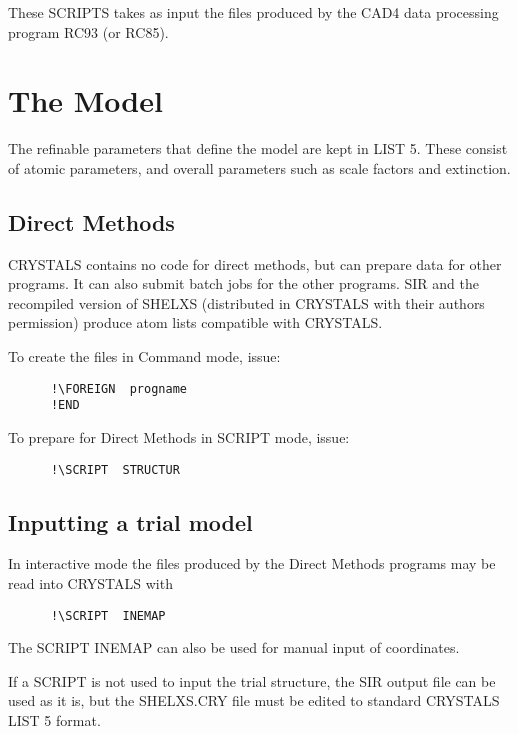 \documentclass[10pt,a4paper]{report}
\begin{document}
These SCRIPTS takes as input the files produced
 by the CAD4 data processing program RC93 (or RC85).



\chapter{The Model}


The refinable parameters that define the model are kept in LIST 5. These consist of atomic parameters, and overall parameters such as scale factors and extinction.

\section{Direct Methods}


CRYSTALS contains no code for direct methods, but can prepare data
 for other programs. It can also submit batch jobs for the other programs.
 SIR and the recompiled version of SHELXS (distributed in CRYSTALS with
 their authors permission) produce atom lists compatible with CRYSTALS.


To create the files in Command mode, issue:

\small\begin{verbatim}
      !\FOREIGN  progname
      !END
\end{verbatim}\normalsize




To prepare for Direct Methods in SCRIPT mode,  issue:

\small\begin{verbatim}
      !\SCRIPT  STRUCTUR
\end{verbatim}\normalsize





\section{Inputting a trial model}


 In interactive mode the files produced
 by the Direct Methods programs may be read into CRYSTALS with

\small\begin{verbatim}
      !\SCRIPT  INEMAP
\end{verbatim}\normalsize


 The SCRIPT INEMAP can also be used for manual input of coordinates.


If a SCRIPT is not used to input the trial structure,
 the SIR output file can be used as it is, but
 the SHELXS.CRY  file must be edited to standard  CRYSTALS LIST 5 format.
\end{document}
